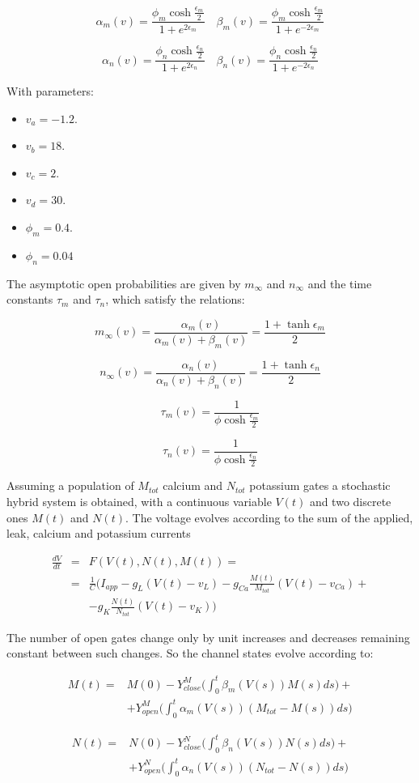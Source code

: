 	$$\alpha_m(v) = \frac{\phi_m\cosh\frac{\epsilon_m}{2}}{1+e^{2\epsilon_m}}\quad\beta_m(v) = \frac{\phi_m\cosh\frac{\epsilon_m}{2}}{1+e^{-2\epsilon_m}}$$

	$$\alpha_n(v) = \frac{\phi_n\cosh\frac{\epsilon_n}{2}}{1+e^{2\epsilon_n}}\quad\beta_n(v) = \frac{\phi_n\cosh\frac{\epsilon_n}{2}}{1+e^{-2\epsilon_n}}$$

	With parameters:

	\begin{multicols}{3}
		\begin{itemize}
			\item $v_a = -1.2$.
			\item $v_b = 18$.
			\item $v_c = 2$.
			\item $v_d = 30$.
			\item $\phi_m = 0.4$.
			\item $\phi_n = 0.04$
		\end{itemize}
	\end{multicols}

	The asymptotic open probabilities are given by $m_\infty$ and $n_\infty$ and the time constants $\tau_m$ and $\tau_n$, which satisfy the relations:

	$$m_\infty(v) = \frac{\alpha_m(v)}{\alpha_m(v) + \beta_m(v)} = \frac{1+\tanh\epsilon_m}{2}$$

	$$n_\infty(v) = \frac{\alpha_n(v)}{\alpha_n(v) + \beta_n(v)} = \frac{1+\tanh\epsilon_n}{2}$$

	$$\tau_m(v) = \frac{1}{\phi\cosh\frac{\epsilon_m}{2}}$$

	$$\tau_n(v) = \frac{1}{\phi\cosh\frac{\epsilon_n}{2}}$$

	Assuming a population of $M_{tot}$ calcium and $N_{tot}$ potassium gates a stochastic hybrid system is obtained, with a continuous variable $V(t)$ and two discrete ones $M(t)$ and $N(t)$.
	The voltage evolves according to the sum of the applied, leak, calcium and potassium currents

	\begin{align*}
		\frac{dV}{dt} &=&  F(V(t), N(t), M(t)) = \\
									&=& \frac{1}{C}\biggl(I_{app} - g_L(V(t)-v_L)-g_{Ca}\frac{M(t)}{M_{tot}}(V(t)-v_{Ca}) +\\
									& &- g_K\frac{N(t)}{N_{tot}}(V(t)-v_K)\biggr)
	\end{align*}

	The number of open gates change only by unit increases and decreases remaining constant between such changes.
	So the channel states evolve according to:

	\begin{align*}
		M(t) =&M(0) - Y_{close}^M\biggl(\int_0^t\beta_m(V(s))M(s)ds\biggr)+\\
					&+Y_{open}^M\biggl(\int_0^t\alpha_m(V(s))(M_{tot}-M(s))ds\biggr)
	\end{align*}

	\begin{align*}
		N(t) =&N(0) - Y_{close}^N\biggl(\int_0^t\beta_n(V(s))N(s)ds\biggr)+\\
					&+Y_{open}^N\biggl(\int_0^t\alpha_n(V(s))(N_{tot}-N(s))ds\biggr)
	\end{align*}
